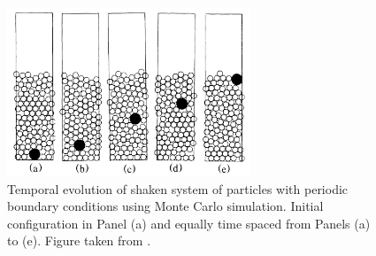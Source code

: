 \begin{figure}
    \centering
    \includegraphics[width=0.65\textwidth]{04-figuras/BNE_Rosato.png}
    \caption[BNE cycles.]{Temporal evolution of shaken system of particles with periodic boundary conditions using Monte Carlo simulation. Initial configuration in Panel (a) and equally time spaced from Panels (a) to (e). Figure taken from \cite{Why_the_Brazil_nuts_are_on_top}.}
    \label{fig:BNE_rosato}
\end{figure}

